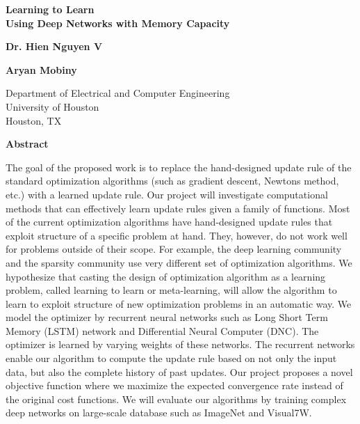 \documentclass[a4paper, 11pt]{article}
\begin{document}
\begin{titlepage}
\begin{center}
\vspace*{1cm}
\textbf{\Huge{Learning to Learn}}\\
\vspace{0.5cm}
\textbf{\Large{Using Deep Networks with Memory Capacity}}
       
\vspace{2cm}
\textbf{Dr. Hien Nguyen V}
        
\textbf{Aryan Mobiny}
        
\vspace{1cm}        
Department of Electrical and Computer Engineering\\
University of Houston\\
Houston, TX

\vspace{5cm}
\textbf{Abstract}
\end{center}
        
The goal of the proposed work is to replace the hand-designed update rule of the standard optimization algorithms (such as gradient descent, Newton\textsc{}s method, etc.) with a learned update rule. Our project will investigate computational methods that can effectively learn update rules given a family of functions. Most of the current optimization algorithms have hand-designed update rules that exploit structure of a specific problem at hand. They, however, do not work well for problems outside of their scope. For example, the deep learning community and the sparsity community use very different set of optimization algorithms. We hypothesize that casting the design of optimization algorithm as a learning problem, called learning to learn or meta-learning, will allow the algorithm to learn to exploit structure of new optimization problems in an automatic way. We model the optimizer by recurrent neural networks such as Long Short Term Memory (LSTM) network and Differential Neural Computer (DNC). The optimizer is learned by varying weights of these networks. The recurrent networks enable our algorithm to compute the update rule based on not only the input data, but also the complete history of past updates. Our project proposes a novel objective function where we maximize the expected convergence rate instead of the original cost functions. We will evaluate our algorithms by training complex deep networks on large-scale database such as ImageNet and Visual7W.

        
\end{titlepage}
\end{document}
